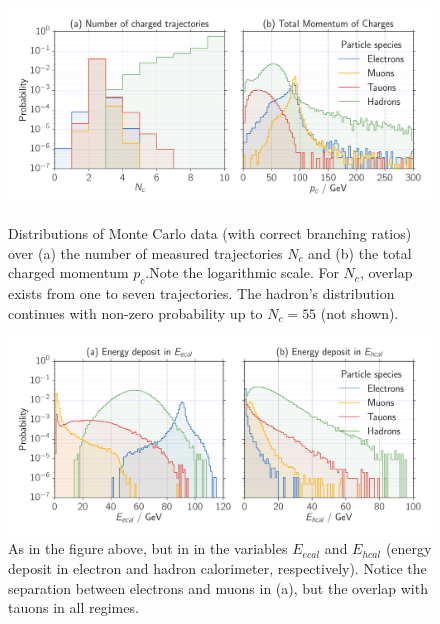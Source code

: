 \begin{figure}[htpb]
    \centering
    \includegraphics[width=1.0\linewidth]{figures/N_p_c}
    \caption{Distributions of Monte Carlo data (with correct branching ratios)
        over (a) the number of measured trajectories $N_c$ and (b) the total charged
        momentum $p_c$.Note the logarithmic scale. 
        For $N_c$, overlap exists from one to seven trajectories. The hadron's distribution 
        continues with non-zero probability up to $N_c = 55$ (not shown). }
    \label{fig:monte1}
    \includegraphics[width=1.0\linewidth]{figures/E_cal}
    \caption{As in the figure above, but in in the variables $E_{ecal}$ and $E_{hcal}$ 
        (energy deposit in electron and hadron calorimeter, respectively). Notice the separation between electrons
    and muons in (a), but the overlap with tauons in all regimes.}
\label{fig:monte2}
\end{figure}

\clearpage
